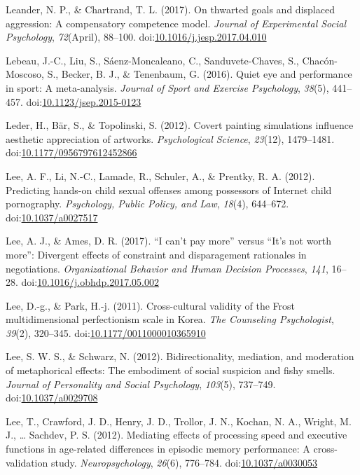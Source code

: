 \documentclass[english,man]{apa6}
\theoremstyle{definition}
\theoremstyle{definition}
\theoremstyle{definition}
\theoremstyle{remark}
\begin{document}
\hypertarget{ref-Leander2017}{}
Leander, N. P., \& Chartrand, T. L. (2017). On thwarted goals and
displaced aggression: A compensatory competence model. \emph{Journal of
Experimental Social Psychology}, \emph{72}(April), 88--100.
doi:\href{https://doi.org/10.1016/j.jesp.2017.04.010}{10.1016/j.jesp.2017.04.010}

\hypertarget{ref-Lebeau2016}{}
Lebeau, J.-C., Liu, S., Sáenz-Moncaleano, C., Sanduvete-Chaves, S.,
Chacón-Moscoso, S., Becker, B. J., \& Tenenbaum, G. (2016). Quiet eye
and performance in sport: A meta-analysis. \emph{Journal of Sport and
Exercise Psychology}, \emph{38}(5), 441--457.
doi:\href{https://doi.org/10.1123/jsep.2015-0123}{10.1123/jsep.2015-0123}

\hypertarget{ref-Leder2012}{}
Leder, H., Bär, S., \& Topolinski, S. (2012). Covert painting
simulations influence aesthetic appreciation of artworks.
\emph{Psychological Science}, \emph{23}(12), 1479--1481.
doi:\href{https://doi.org/10.1177/0956797612452866}{10.1177/0956797612452866}

\hypertarget{ref-Lee2012b}{}
Lee, A. F., Li, N.-C., Lamade, R., Schuler, A., \& Prentky, R. A.
(2012). Predicting hands-on child sexual offenses among possessors of
Internet child pornography. \emph{Psychology, Public Policy, and Law},
\emph{18}(4), 644--672.
doi:\href{https://doi.org/10.1037/a0027517}{10.1037/a0027517}

\hypertarget{ref-Lee2017}{}
Lee, A. J., \& Ames, D. R. (2017). ``I can't pay more'' versus ``It's
not worth more'': Divergent effects of constraint and disparagement
rationales in negotiations. \emph{Organizational Behavior and Human
Decision Processes}, \emph{141}, 16--28.
doi:\href{https://doi.org/10.1016/j.obhdp.2017.05.002}{10.1016/j.obhdp.2017.05.002}

\hypertarget{ref-Lee2011}{}
Lee, D.-g., \& Park, H.-j. (2011). Cross-cultural validity of the Frost
multidimensional perfectionism scale in Korea. \emph{The Counseling
Psychologist}, \emph{39}(2), 320--345.
doi:\href{https://doi.org/10.1177/0011000010365910}{10.1177/0011000010365910}

\hypertarget{ref-Lee2012}{}
Lee, S. W. S., \& Schwarz, N. (2012). Bidirectionality, mediation, and
moderation of metaphorical effects: The embodiment of social suspicion
and fishy smells. \emph{Journal of Personality and Social Psychology},
\emph{103}(5), 737--749.
doi:\href{https://doi.org/10.1037/a0029708}{10.1037/a0029708}

\hypertarget{ref-Lee2012a}{}
Lee, T., Crawford, J. D., Henry, J. D., Trollor, J. N., Kochan, N. A.,
Wright, M. J., \ldots{} Sachdev, P. S. (2012). Mediating effects of
processing speed and executive functions in age-related differences in
episodic memory performance: A cross-validation study.
\emph{Neuropsychology}, \emph{26}(6), 776--784.
doi:\href{https://doi.org/10.1037/a0030053}{10.1037/a0030053}
\end{document}
